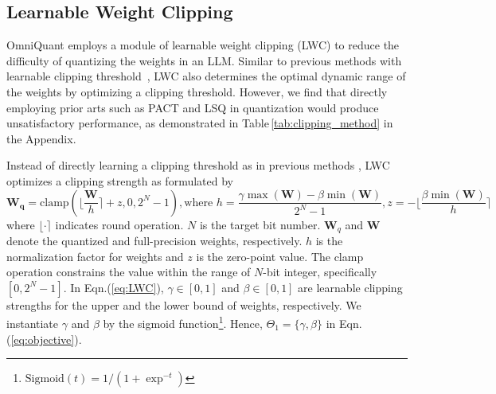 \documentclass{article} %
\begin{document}



\subsection{Learnable Weight Clipping}\label{sec:LWC}
OmniQuant employs a module of learnable weight clipping (LWC) to reduce the difficulty of quantizing the weights in an LLM. Similar to previous methods with learnable clipping threshold~\citep{lsq,statsq,pact}, LWC also determines the optimal dynamic range of the weights by optimizing a clipping threshold. However, we find that directly employing prior arts such as PACT \citep{pact} and LSQ \citep{lsq} in quantization would produce unsatisfactory performance, as demonstrated in Table\,\ref{tab:clipping_method} in the Appendix.


Instead of directly learning a clipping threshold as in previous methods \citep{lsq,pact}, LWC optimizes a clipping strength as formulated by
\begin{equation}\label{eq:LWC}
    \mathbf{W_q} = \mathrm{clamp}(\lfloor \frac{\mathbf{W}}{h} \rceil + z, 0, 2^{N}-1), \mathrm{where}\,\, h=\frac{\gamma\max(\mathbf{W})-\beta\min(\mathbf{W} )}{2^{N}-1}, z=-\lfloor \frac{\beta\min(\mathbf{W})}{h} \rceil
\end{equation}
where $\lfloor \cdot \rceil$ indicates round operation. $N$ is the target bit number. $\mathbf{W}_q$ and $\mathbf{W}$ denote the quantized and full-precision weights, respectively. $h$ is the normalization factor for weights and $z$ is the zero-point value. The clamp operation constrains the value within the range of $N$-bit integer, specifically $[0, 2^{N}-1]$. In Eqn.(\ref{eq:LWC}), $\gamma\in[0,1]$ and $\beta\in[0,1]$ are learnable clipping strengths for the upper and the lower bound of weights, respectively. We instantiate $\gamma$ and $\beta$ by the sigmoid function\footnote{$\mathrm{Sigmoid}(t)=1/(1+\exp^{-t})$}. Hence, $\Theta_1=\{\gamma,\beta\}$ in Eqn.(\ref{eq:objective}).
\end{document}
